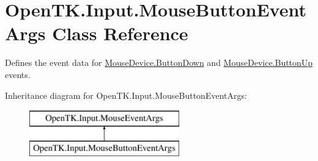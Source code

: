 \hypertarget{class_open_t_k_1_1_input_1_1_mouse_button_event_args}{\section{Open\-T\-K.\-Input.\-Mouse\-Button\-Event\-Args Class Reference}
\label{class_open_t_k_1_1_input_1_1_mouse_button_event_args}
}


Defines the event data for \hyperlink{class_open_t_k_1_1_input_1_1_mouse_device_a6d161629ddeb7adefb6f8332824778bd}{Mouse\-Device.\-Button\-Down} and \hyperlink{class_open_t_k_1_1_input_1_1_mouse_device_a244f6f68b32bfe3f745e2b8087e970e8}{Mouse\-Device.\-Button\-Up} events.  


Inheritance diagram for Open\-T\-K.\-Input.\-Mouse\-Button\-Event\-Args\-:\begin{figure}[H]
\begin{center}
\leavevmode
\includegraphics[height=2.000000cm]{class_open_t_k_1_1_input_1_1_mouse_button_event_args}
\end{center}
\end{figure}
